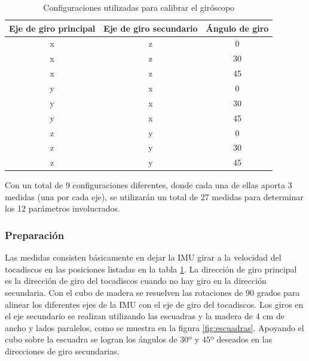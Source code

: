 \documentclass[spanish,12pt,a4paper,titlepage]{report}
\begin{document}
\begin{table}[H]
\centering
\begin{small}
\begin{tabular}{|c|c|c|}
\hline
  {\cellcolor[gray]{0.85} \centering \textbf{Eje de giro principal}}
& {\cellcolor[gray]{0.85} \centering \textbf{Eje de giro secundario}}
& {\cellcolor[gray]{0.85} \centering \textbf{Ángulo de giro}} \\ \hline  \hline
x & z & 0 \\ \hline
x & z & 30 \\ \hline
x & z & 45 \\ \hline
y & x & 0 \\ \hline
y & x & 30 \\ \hline
y & x & 45 \\ \hline
z & y & 0 \\ \hline
z & y & 30 \\ \hline
z & y & 45 \\ \hline
\end{tabular}
\caption{Configuraciones utilizadas para calibrar el giróscopo}
\label{tab:gyros}
\end{small}
\end{table} 

Con un total de 9 configuraciones diferentes, donde cada una de ellas aporta 3 medidas (una por cada eje), se utilizarán un total de 27 medidas para determinar los 12 parámetros involucrados.

\subsubsection*{Preparación}

Las medidas consisten básicamente en dejar la IMU girar a la velocidad del tocadiscos en las posiciones listadas en la tabla \ref{tab:gyros}. La dirección de giro principal es la dirección de giro del tocadiscos cuando no hay giro en la dirección secundaria. Con el cubo de madera se resuelven las rotaciones de 90 grados para alinear los diferentes ejes de la IMU con el eje de giro del tocadiscos. Los giros en el eje secundario se realizan utilizando las escuadras y la madera de 4 cm de ancho y lados paralelos, como se muestra en la figura \ref{fig:escuadras}. Apoyando el cubo sobre la escuadra se logran los ángulos de $30º$ y $45º$ deseados en las direcciones de giro secundarias.
\end{document}
